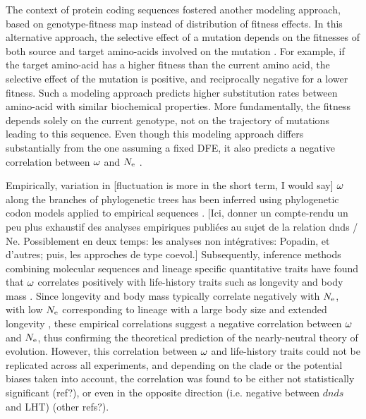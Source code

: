 \documentclass{article}
\begin{document}
	The context of protein coding sequences fostered another modeling approach, based on genotype-fitness map instead of distribution of fitness effects.
	In this alternative approach, the selective effect of a mutation depends on the fitnesses of both source and target amino-acids involved on the mutation \cite{Halpern1998}.
	For example, if the target amino-acid has a higher fitness than the current amino acid, the selective effect of the mutation is positive, and reciprocally negative for a lower fitness.
	Such a modeling approach predicts higher substitution rates between amino-acid with similar biochemical properties.
	More fundamentally, the fitness depends solely on the current genotype, not on the trajectory of mutations leading to this sequence.
	Even though this modeling approach differs substantially from the one assuming a fixed DFE, it also predicts a negative correlation between $\omega$ and $N_{\mathrm{e}}$ \cite{Spielman2015a, DosReis2015}.
	
	Empirically, variation in [fluctuation is more in the short term, I would say] $\omega$ along the branches of phylogenetic trees has been inferred using phylogenetic codon models applied to empirical sequences \cite{Yang2001, Zhang2004}. [Ici, donner un compte-rendu un peu plus exhaustif des analyses empiriques publiées au sujet de la relation dnds / Ne. Possiblement en deux temps: les analyses non intégratives: Popadin, et d'autres; puis, les approches de type coevol.]
	Subsequently, inference methods combining molecular sequences and lineage specific quantitative traits have found that $\omega$ correlates positively with life-history traits such as longevity and body mass \cite{Lartillot2011,Weber2014}.
	Since longevity and body mass typically correlate negatively with $N_{\mathrm{e}}$, with low $N_{\mathrm{e}}$ corresponding to lineage with a large body size and extended longevity \cite{Romiguier2014}, these empirical correlations suggest a negative correlation between $\omega$ and $N_{\mathrm{e}}$, thus confirming the theoretical prediction of the nearly-neutral theory of evolution.
	However, this correlation between $\omega$ and life-history traits could not be replicated across all experiments, and depending on the clade or the potential biases taken into account, the correlation was found to be either not statistically significant (ref?), or even in the opposite direction (i.e. negative between $dnds$ and LHT) \cite{Figuet2016} (other refs?).
	
\end{document}
